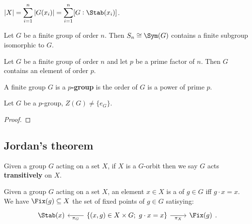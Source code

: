 \documentclass[../Year2.tex]{subfiles}
\begin{document}
\vspace{-15pt}

\begin{corollary}
    $\displaystyle|X| = \sum_{i=1}^n|G(x_i)| = \sum_{i=1}^n[G:\Stab(x_i)]$. 
\end{corollary}

\begin{corollary}
    Let $G$ be a finite group of order $n$. Then $S_n\cong\Sym(G)$ contains a finite subgroup isomorphic to $G$.
\end{corollary}

\begin{corollary}
    Let $G$ be a finite group of order $n$ and let $p$ be a prime factor of $n$. Then $G$ contains an element of order $p$.
\end{corollary}

\begin{definition}[$p$-group]
    A finite group $G$ is a \textbf{$p$-group} is the order of $G$ is a power of prime $p$.
\end{definition}

\begin{theorem}
    Let $G$ be a $p$-group, $Z(G)\neq \{e_G\}$.
    \begin{proof}
        
    \end{proof}
\end{theorem}

\subsection{Jordan's theorem}

\begin{definition}
    Given a group $G$ acting on a set $X$, if $X$ is a $G$-orbit then we say $G$ acts \textbf{transitively} on $X$.
\end{definition}

\begin{definition}
    Given a group $G$ acting on a set $X$, an element $x\in X$ is a  of $g\in G$ iff $g\cdot x=x$. We have $\Fix(g)\subseteq X$ the set of fixed points of $g\in G$ satisying: \[
        \begin{tikzcd}
            \Stab(x) & \arrow[l, "\pi_G"] \{(x,g)\in X\times G; \  g\cdot x = x\} \arrow[r, swap, "\pi_X"] & \Fix(g)
        \end{tikzcd}
        \black{.}
    \]
\end{definition}
\end{document}
